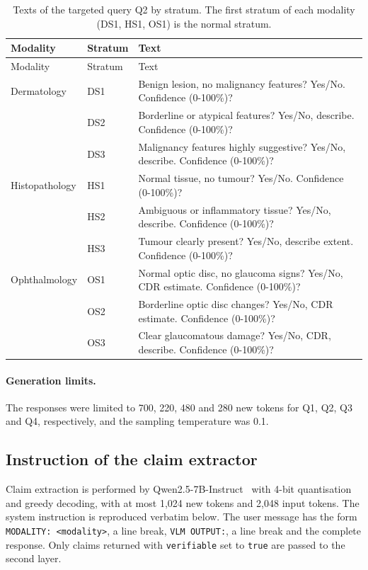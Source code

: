 \documentclass[11pt,a4paper]{article}
\begin{document}
\begin{appendices}
\begin{longtable}{@{}p{1.9cm}p{1.2cm}p{12.2cm}@{}}
\caption{Texts of the targeted query Q2 by stratum. The first stratum of each modality (DS1, HS1, OS1) is the normal stratum.}\label{tab:prompts_q2}\\
\toprule
Modality & Stratum & Text \\
\midrule
\endfirsthead
\toprule
Modality & Stratum & Text \\
\midrule
\endhead
\bottomrule
\endfoot
Dermatology & DS1 & Benign lesion, no malignancy features? Yes/No. Confidence (0-100\%)? \\
 & DS2 & Borderline or atypical features? Yes/No, describe. Confidence (0-100\%)? \\
 & DS3 & Malignancy features highly suggestive? Yes/No, describe. Confidence (0-100\%)? \\
\addlinespace
Histopathology & HS1 & Normal tissue, no tumour? Yes/No. Confidence (0-100\%)? \\
 & HS2 & Ambiguous or inflammatory tissue? Yes/No, describe. Confidence (0-100\%)? \\
 & HS3 & Tumour clearly present? Yes/No, describe extent. Confidence (0-100\%)? \\
\addlinespace
Ophthalmology & OS1 & Normal optic disc, no glaucoma signs? Yes/No, CDR estimate. Confidence (0-100\%)? \\
 & OS2 & Borderline optic disc changes? Yes/No, CDR estimate. Confidence (0-100\%)? \\
 & OS3 & Clear glaucomatous damage? Yes/No, CDR, describe. Confidence (0-100\%)? \\
\end{longtable}
\endgroup

\paragraph{Generation limits.} The responses were limited to 700, 220, 480 and 280 new tokens for Q1, Q2, Q3 and Q4, respectively, and the sampling temperature was 0.1.

\subsection{Instruction of the claim extractor}
\label{app:extractor_prompt}

Claim extraction is performed by Qwen2.5-7B-Instruct~\citep{qwen2024qwen25} with 4-bit quantisation and greedy decoding, with at most 1{,}024 new tokens and 2{,}048 input tokens. The system instruction is reproduced verbatim below. The user message has the form \texttt{MODALITY: <modality>}, a line break, \texttt{VLM OUTPUT:}, a line break and the complete response. Only claims returned with \texttt{verifiable} set to \texttt{true} are passed to the second layer.


\end{appendices}
\end{document}
